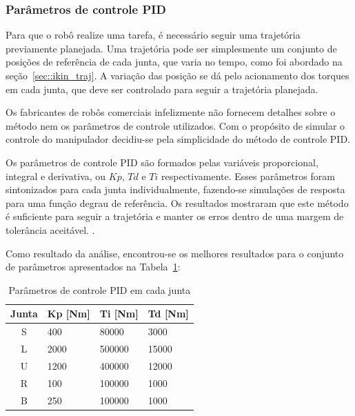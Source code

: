 \subsubsection{Parâmetros de controle PID}

Para que o robô realize uma tarefa, é necessário seguir uma trajetória
previamente planejada. Uma trajetória pode ser simplesmente um conjunto de
posições de referência de cada junta, que varia no tempo, como foi abordado na
seção~\ref{sec::ikin_traj}. A variação das posição se dá pelo acionamento dos
torques em cada junta, que deve ser controlado para seguir a trajetória
planejada. 

Os fabricantes de robôs comerciais infelizmente não fornecem detalhes sobre o
método nem os parâmetros de controle utilizados.
Com o propósito de simular o controle do manipulador decidiu-se pela
simplicidade do método de controle PID.

Os parâmetros de controle PID são formados pelas variáveis proporcional,
integral e derivativa, ou $Kp$, $Td$ e $Ti$ respectivamente. Esses parâmetros
foram sintonizados para cada junta individualmente, fazendo-se simulações de
resposta para uma função degrau de referência. Os resultados mostraram que este
método é suficiente para seguir a trajetória e manter os erros dentro de uma
margem de tolerância aceitável. 
.

Como resultado da análise, encontrou-se os melhores resultados
para o conjunto de parâmetros apresentados na
Tabela~\ref{tab::pid}:
%
\begin{table}[h]
\centering
\caption{Parâmetros de controle PID em cada junta}
\label{tab::pid}
\begin{tabular}{@{}clll@{}}
\toprule
\textbf{Junta} & \textbf{Kp [Nm]} & \textbf{Ti [Nm]} & \textbf{Td [Nm]} \\ \midrule 
S              & 400         & 80000       & 3000        \\
L              & 2000        & 500000      & 15000       \\
U              & 1200        & 400000      & 12000       \\
R              & 100         & 100000      & 1000        \\
B              & 250         & 100000      & 1000        \\ \bottomrule
\end{tabular}
\end{table}
%

